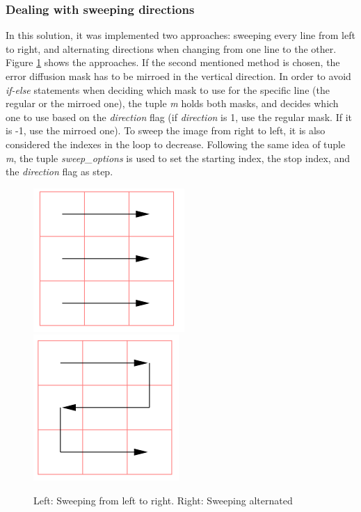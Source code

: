 \documentclass[]{IEEEtran}
\begin{document}
\subsubsection{Dealing with sweeping directions}
In this solution, it was implemented two approaches: sweeping every line from left to right, and alternating directions when changing from one line to the other. Figure \ref{fig:sweepingmodes} shows the approaches. If the second mentioned method is chosen, the error diffusion mask has to be mirroed in the vertical direction. In order to avoid \textit{if-else} statements when deciding which mask to use for the specific line (the regular or the mirroed one), the tuple \textit{m} holds both masks, and decides which one to use based on the \textit{direction} flag (if \textit{direction} is 1, use the regular mask. If it is -1, use the mirroed one). To sweep the image from right to left, it is also considered the indexes in the loop to decrease. Following the same idea of tuple \textit{m}, the tuple \textit{sweep\_options} is used to set the starting index, the stop index, and the \textit{direction} flag as step.

\begin{figure}[H]
  \centering
  \includegraphics[width=0.4\hsize]{images/sw-left-to-right.png}
  \includegraphics[width=0.4\hsize]{images/sw-alternate.png}
  \caption{Left: Sweeping from left to right. Right: Sweeping alternated}
  \label{fig:sweepingmodes}
\end{figure}
\end{document}
